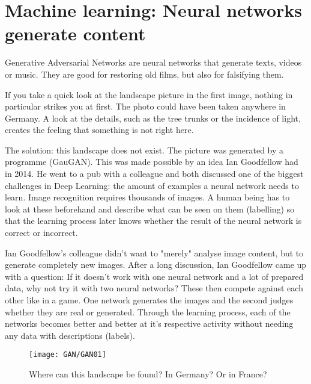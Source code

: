 %
%
%
%





\chapter{Machine learning: Neural networks generate content}

Generative Adversarial Networks are neural networks that generate texts, videos or music. They are good for restoring old films, but also for falsifying them.

If you take a quick look at the landscape picture in the first image, nothing in
particular strikes you at first. The photo could have been taken anywhere in Germany. A look at the details, such as the tree trunks or the incidence of light, creates the feeling that something is not right here. 

The solution: this landscape does not exist. The picture was generated by a programme (GauGAN). This was made possible by an idea Ian Goodfellow had in 2014. He went to a pub with a colleague and both discussed one of the biggest challenges in Deep Learning: the amount of examples a neural network needs to learn. Image recognition requires thousands of images. A human being has to look at these beforehand and describe what can be seen on them (labelling) so that the learning process later knows whether the result of the neural network is correct or incorrect.

Ian Goodfellow's colleague didn't want to "merely" analyse image content, but to generate completely new images. After a long discussion, Ian Goodfellow came up with a question: If it doesn't work with one neural network and a lot of prepared data, why not try it with two neural networks? These then compete against each other like in a game. One network generates the images and the second judges whether they are real or generated. Through the learning process, each of the networks becomes better and better at it's respective activity without needing any data with descriptions (labels).


\begin{figure}
  \texttt{[image: GAN/GAN01]}
  \caption{Where can this landscape be found? In Germany? Or in France?} 
  \label{GAN01}
\end{figure}


